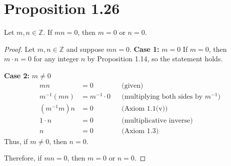 \section*{Proposition 1.26}
Let $m, n \in \mathbb{Z}$. If $mn = 0$, then $m = 0$ or $n = 0$.
\begin{proof}
    Let $m, n \in \mathbb{Z}$ and suppose $mn = 0$.
    \textbf{Case 1:} $m = 0$
    If $m = 0$, then $m \cdot n = 0$ for any integer $n$ by Proposition 1.14, so the statement holds.

    \textbf{Case 2:} $m \neq 0$
    \begin{align*}
        mn         & = 0              &  & \text{(given)}                              \\
        m^{-1}(mn) & = m^{-1} \cdot 0 &  & \text{(multiplying both sides by $m^{-1}$)} \\
        (m^{-1}m)n & = 0              &  & \text{(Axiom 1.1(v))}                       \\
        1 \cdot n  & = 0              &  & \text{(multiplicative inverse)}             \\
        n          & = 0              &  & \text{(Axiom 1.3)}
    \end{align*}
    Thus, if $m \neq 0$, then $n = 0$.

    Therefore, if $mn = 0$, then $m = 0$ or $n = 0$.
\end{proof}

